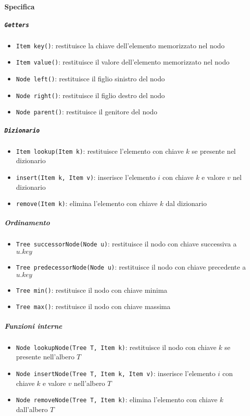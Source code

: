     \paragraph{Specifica}
        \subparagraph{\texttt{Getters}}
            \begin{itemize}
                \item \texttt{Item key()}: restituisce la chiave dell'elemento memorizzato nel nodo
                \item \texttt{Item value()}: restituisce il valore dell'elemento memorizzato nel nodo
                \item \texttt{Node left()}: restituisce il figlio sinistro del nodo
                \item \texttt{Node right()}: restituisce il figlio destro del nodo
                \item \texttt{Node parent()}: restituisce il genitore del nodo
            \end{itemize}
        \subparagraph{\texttt{Dizionario}}
            \begin{itemize}
                \item \texttt{Item lookup(Item k)}: restituisce l'elemento con chiave $ k $ se presente nel dizionario
                \item \texttt{insert(Item k, Item v)}: inserisce l'elemento $ i $ con chiave $ k $ e valore $ v $ nel dizionario
                \item \texttt{remove(Item k)}: elimina l'elemento con chiave $ k $ dal dizionario
            \end{itemize}
        \subparagraph{Ordinamento}
            \begin{itemize}
                \item \texttt{Tree successorNode(Node u)}: restituisce il nodo con chiave successiva a $ u.key $
                \item \texttt{Tree predecessorNode(Node u)}: restituisce il nodo con chiave precedente a $ u.key $
                \item \texttt{Tree min()}: restituisce il nodo con chiave minima
                \item \texttt{Tree max()}: restituisce il nodo con chiave massima
            \end{itemize}
        \subparagraph{Funzioni interne}
            \begin{itemize}
                \item \texttt{Node lookupNode(Tree T, Item k)}: restituisce il nodo con chiave $ k $ se presente nell'albero $ T $
                \item \texttt{Node insertNode(Tree T, Item k, Item v)}: inserisce l'elemento $ i $ con chiave $ k $ e valore $ v $ nell'albero $ T $
                \item \texttt{Node removeNode(Tree T, Item k)}: elimina l'elemento con chiave $ k $ dall'albero $ T $
            \end{itemize}
